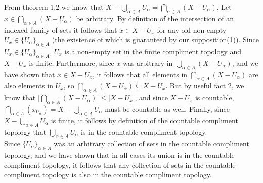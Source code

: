 \documentclass{article}
\theoremstyle{definition}
\begin{document}
\begin{enumerate}
    From theorem 1.2 we know that $X - \bigcup_{\alpha\in A}U_\alpha = 
    \bigcap_{\alpha\in A}(X-U_\alpha)$. Let $x\in \bigcap_{\alpha\in A}(X-U_\alpha)$ be arbitrary. By definition of the intersection of an indexed family of sets it follows that $x\in X-U_x$ for any old non-empty $U_x\in \{U_\alpha\}_{\alpha\in A}$ (the existence of which is guaranteed by our supposition(1)). Since $U_x\in \{U_\alpha\}_{\alpha\in A}$, $U_x$ is a non-empty set in the finite compliment topology and $X-U_x$ is finite. Furthermore, since $x$ was arbitrary in $\bigcup_{\alpha\in A}(X- U_\alpha)$, and we have shown that $x\in X-U_x$, it follows that all elements in $\bigcap_{\alpha\in A}(X-U_\alpha)$ are also elements in $U_x$, so $\bigcap_{\alpha\in A}(X-U_\alpha)\subseteq X-U_x$. But by useful fact 2,  we know that $\big | \bigcap_{\alpha\in A}(X-U_\alpha)\big | \le  |X-U_x| $, and since $X-U_x$ is countable, $\bigcap_{\alpha\in A}(x_U_\alpha) = X - \bigcup_{\alpha\in A}U_\alpha$ must be countable as well. Finally, since  $X - \bigcup_{\alpha\in A}U_\alpha$ is finite, it follows by definition of the countable compliment topology that $\bigcup_{\alpha\in A}U_\alpha$ is in the countable compliment topology. \\
    
    Since $\{U_\alpha\}_{\alpha\in A}$ was an arbitrary collection of sets in the countable compliment topology, and we have shown that in all cases its union is in the countable compliment topology, it follows that any collection of sets in the countable compliment topology is also in the countable compliment topology. 
\end{enumerate}\\
\end{document}
